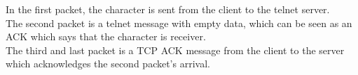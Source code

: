 In the first packet, the character is sent from the client to the telnet server.\\
The second packet is a telnet message with empty data, which can be seen as an ACK which says that the character is receiver.\\
The third and last packet is a TCP ACK message from the client to the server which acknowledges the second packet's arrival.\\ 
